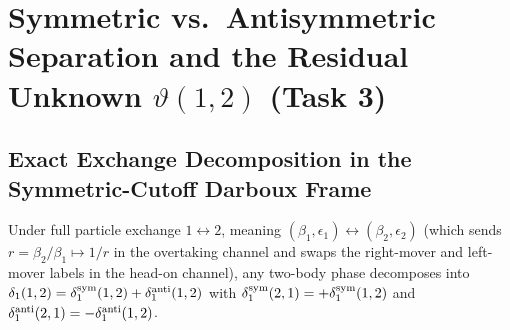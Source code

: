 \documentclass[11pt,a4paper]{article}
\begin{document}
\section{Symmetric vs.\ Antisymmetric Separation and the Residual Unknown $\vartheta(1,2)$ (Task 3)}

\subsection{Exact Exchange Decomposition in the Symmetric-Cutoff Darboux Frame}

Under full particle exchange $1\leftrightarrow 2$, meaning $(\beta_1,\epsilon_1)\leftrightarrow(\beta_2,\epsilon_2)$ (which sends $r=\beta_2/\beta_1\mapsto 1/r$ in the overtaking channel and swaps the right-mover and left-mover labels in the head-on channel), any two-body phase decomposes into $\delta_1(1,2)=\delta_1^{\rm sym}(1,2)+\delta_1^{\rm anti}(1,2)$ with $\delta_1^{\rm sym}(2,1)=+\delta_1^{\rm sym}(1,2)$ and $\delta_1^{\rm anti}(2,1)=-\delta_1^{\rm anti}(1,2)$.
\end{document}
